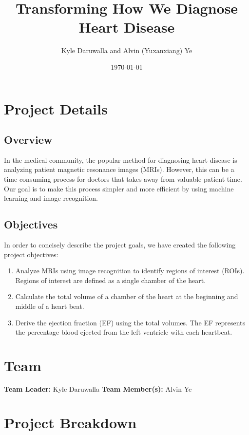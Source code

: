 \documentclass[12pt]{article}
\title{Transforming How We Diagnose Heart Disease}
\author{Kyle Daruwalla and Alvin (Yuxanxiang) Ye}
\date{\today}
\begin{document}
	
\maketitle

\section{Project Details}

\subsection{Overview}
In the medical community, the popular method for diagnosing heart disease is analyzing patient magnetic resonance images (MRIs). However, this can be a time consuming process for doctors that takes away from valuable patient time. Our goal is to make this process simpler and more efficient by using machine learning and image recognition.

\subsection{Objectives}
In order to concisely describe the project goals, we have created the following project objectives:
\begin{enumerate}
	\item Analyze MRIs using image recognition to identify regions of interest (ROIs). Regions of interest are defined as a single chamber of the heart.
	\item Calculate the total volume of a chamber of the heart at the beginning and middle of a heart beat.
	\item Derive the ejection fraction (EF) using the total volumes. The EF represents the percentage blood ejected from the left ventricle with each heartbeat.
\end{enumerate}

\section{Team}
\textbf{Team Leader:} Kyle Daruwalla
\textbf{Team Member(s):} Alvin Ye

\section{Project Breakdown}
\end{document}
